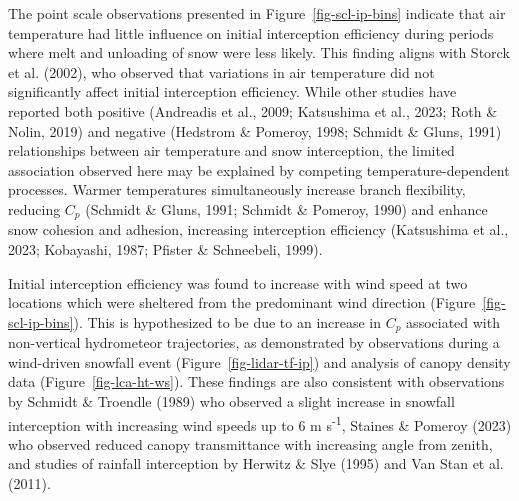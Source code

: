 \documentclass[
  letterpaper,
  DIV=11,
  numbers=noendperiod]{scrartcl}
\begin{document}
The point scale observations presented in Figure~\ref{fig-scl-ip-bins}
indicate that air temperature had little influence on initial
interception efficiency during periods where melt and unloading of snow
were less likely. This finding aligns with Storck et al. (2002), who
observed that variations in air temperature did not significantly affect
initial interception efficiency. While other studies have reported both
positive (Andreadis et al., 2009; Katsushima et al., 2023; Roth \&
Nolin, 2019) and negative (Hedstrom \& Pomeroy, 1998; Schmidt \& Gluns,
1991) relationships between air temperature and snow interception, the
limited association observed here may be explained by competing
temperature-dependent processes. Warmer temperatures simultaneously
increase branch flexibility, reducing \(C_p\) (Schmidt \& Gluns, 1991;
Schmidt \& Pomeroy, 1990) and enhance snow cohesion and adhesion,
increasing interception efficiency (Katsushima et al., 2023; Kobayashi,
1987; Pfister \& Schneebeli, 1999).

Initial interception efficiency was found to increase with wind speed at
two locations which were sheltered from the predominant wind direction
(Figure~\ref{fig-scl-ip-bins}). This is hypothesized to be due to an
increase in \(C_p\) associated with non-vertical hydrometeor
trajectories, as demonstrated by observations during a wind-driven
snowfall event (Figure~\ref{fig-lidar-tf-ip}) and analysis of canopy
density data (Figure~\ref{fig-lca-ht-ws}). These findings are also
consistent with observations by Schmidt \& Troendle (1989) who observed
a slight increase in snowfall interception with increasing wind speeds
up to 6 m s\textsuperscript{-1}, Staines \& Pomeroy (2023) who observed
reduced canopy transmittance with increasing angle from zenith, and
studies of rainfall interception by Herwitz \& Slye (1995) and Van Stan
et al. (2011).
\end{document}
